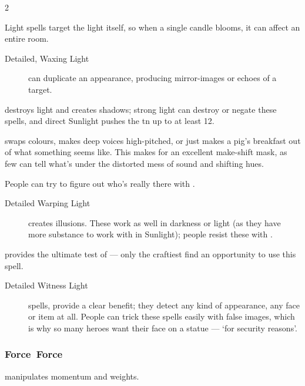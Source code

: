 \begin{multicols}{2}
\begin{description}
  Light \glspl{spell} target the light itself, so when a single candle blooms, it can affect an entire room.

  \begin{description}
    \item[Detailed, Waxing Light]
    can duplicate an appearance, producing mirror-images or echoes of a target.
  \end{description}

  \item[Waning Light]
  destroys light and creates shadows; strong light can destroy or negate these \glspl{spell}, and direct Sunlight pushes the \gls{tn} up to at least 12.

  \item[Warping Light]
  swaps colours, makes deep voices high-pitched, or just makes a pig's
  breakfast out of what something seems like.  This makes for an excellent
  make-shift mask, as few can tell what's under the distorted mess of sound and
  shifting hues.

  People can try to figure out who's really there with .

  \begin{description}
    \item[Detailed Warping Light]
    creates illusions.
    These work as well in darkness or light (as they have more substance to work with in Sunlight); people resist these with .
  \end{description}

  \item[Witnessing Light]
  provides the ultimate test of  --- only the craftiest find an opportunity to use this \gls{spell}.

  \begin{description}
    \item[Detailed Witness Light]
    \glspl{spell}, provide a clear benefit; they detect any kind of appearance, any face or item at all.
    People can trick these \glspl{spell} easily with false images, which is why so many heroes want their face on a statue --- `for security reasons'.
  \end{description}
\end{description}

\subsubsection[Force]{\gls{Force}~Force}
manipulates momentum and \glspl{weight}.


\end{multicols}
